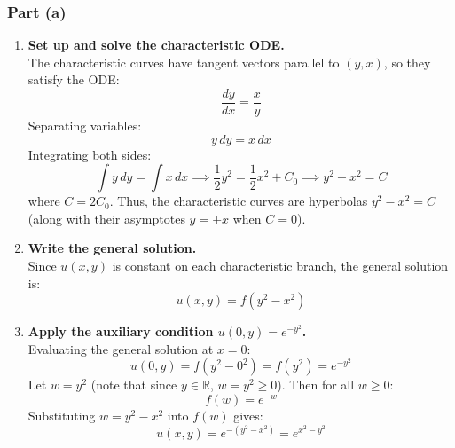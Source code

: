 \documentclass[11pt]{article}
\begin{document}
\subsubsection*{Part (a)}
\begin{enumerate}[label=\textbf{Step \arabic*:}]
    \item \textbf{Set up and solve the characteristic ODE.} \\
    The characteristic curves have tangent vectors parallel to $(y, x)$, so they satisfy the ODE:
    \[
    \frac{dy}{dx} = \frac{x}{y}
    \]
    Separating variables:
    \[
    y\,dy = x\,dx
    \]
    Integrating both sides:
    \[
    \int y\,dy = \int x\,dx \implies \frac{1}{2}y^2 = \frac{1}{2}x^2 + C_0 \implies y^2 - x^2 = C
    \]
    where $C = 2C_0$. Thus, the characteristic curves are hyperbolas $y^2 - x^2 = C$ (along with their asymptotes $y = \pm x$ when $C = 0$).

    \item \textbf{Write the general solution.} \\
    Since $u(x, y)$ is constant on each characteristic branch, the general solution is:
    \[
    u(x, y) = f(y^2 - x^2)
    \]

    \item \textbf{Apply the auxiliary condition $u(0, y) = e^{-y^2}$.} \\
    Evaluating the general solution at $x = 0$:
    \[
    u(0, y) = f(y^2 - 0^2) = f(y^2) = e^{-y^2}
    \]
    Let $w = y^2$ (note that since $y \in \mathbb{R}$, $w = y^2 \ge 0$). Then for all $w \ge 0$:
    \[
    f(w) = e^{-w}
    \]
    Substituting $w = y^2 - x^2$ into $f(w)$ gives:
    \[
    u(x, y) = e^{-(y^2 - x^2)} = e^{x^2 - y^2}
    \]
\end{enumerate}
\end{document}
